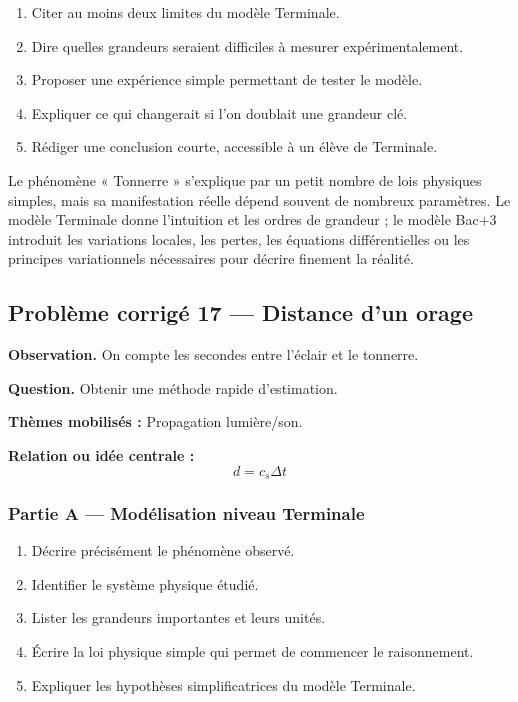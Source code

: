 \documentclass[11pt,a4paper]{article}
\begin{document}
\begin{enumerate}
  \item Citer au moins deux limites du modèle Terminale.
  \item Dire quelles grandeurs seraient difficiles à mesurer expérimentalement.
  \item Proposer une expérience simple permettant de tester le modèle.
  \item Expliquer ce qui changerait si l'on doublait une grandeur clé.
  \item Rédiger une conclusion courte, accessible à un élève de Terminale.
\end{enumerate}

\begin{corrigebox}
Le phénomène « Tonnerre » s'explique par un petit nombre de lois physiques simples, mais sa manifestation réelle dépend souvent de nombreux paramètres. Le modèle Terminale donne l'intuition et les ordres de grandeur ; le modèle Bac+3 introduit les variations locales, les pertes, les équations différentielles ou les principes variationnels nécessaires pour décrire finement la réalité.
\end{corrigebox}

\subsection{Problème corrigé 17 — Distance d'un orage}

\begin{exercicebox}
\textbf{Observation.} On compte les secondes entre l'éclair et le tonnerre.

\medskip
\textbf{Question.} Obtenir une méthode rapide d'estimation.

\medskip
\textbf{Thèmes mobilisés :} Propagation lumière/son.

\medskip
\textbf{Relation ou idée centrale :}
\[
d=c_s\Delta t
\]
\end{exercicebox}

\subsubsection*{Partie A — Modélisation niveau Terminale}

\begin{enumerate}
  \item Décrire précisément le phénomène observé.
  \item Identifier le système physique étudié.
  \item Lister les grandeurs importantes et leurs unités.
  \item Écrire la loi physique simple qui permet de commencer le raisonnement.
  \item Expliquer les hypothèses simplificatrices du modèle Terminale.
\end{enumerate}
\end{document}
